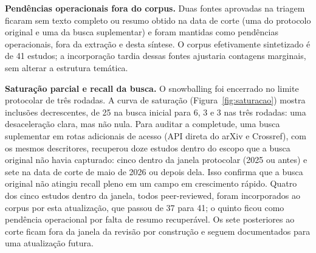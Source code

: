 \noindent\textbf{Pendências operacionais fora do corpus.} Duas fontes aprovadas na triagem ficaram sem texto completo ou resumo obtido na data de corte (uma do protocolo original e uma da busca suplementar) e foram mantidas como pendências operacionais, fora da extração e desta síntese. O corpus efetivamente sintetizado é de 41 estudos; a incorporação tardia dessas fontes ajustaria contagens marginais, sem alterar a estrutura temática.

\noindent\textbf{Saturação parcial e recall da busca.} O snowballing foi encerrado no limite protocolar de três rodadas. A curva de saturação (Figura~\ref{fig:saturacao}) mostra inclusões decrescentes, de 25 na busca inicial para 6, 3 e 3 nas três rodadas: uma desaceleração clara, mas não nula. Para auditar a completude, uma busca suplementar em rotas adicionais de acesso (API direta do arXiv e Crossref), com os mesmos descritores, recuperou doze estudos dentro do escopo que a busca original não havia capturado: cinco dentro da janela protocolar (2025 ou antes) e sete na data de corte de maio de 2026 ou depois dela. Isso confirma que a busca original não atingiu recall pleno em um campo em crescimento rápido. Quatro dos cinco estudos dentro da janela, todos peer-reviewed, foram incorporados ao corpus por esta atualização, que passou de 37 para 41; o quinto ficou como pendência operacional por falta de resumo recuperável. Os sete posteriores ao corte ficam fora da janela da revisão por construção e seguem documentados para uma atualização futura.
